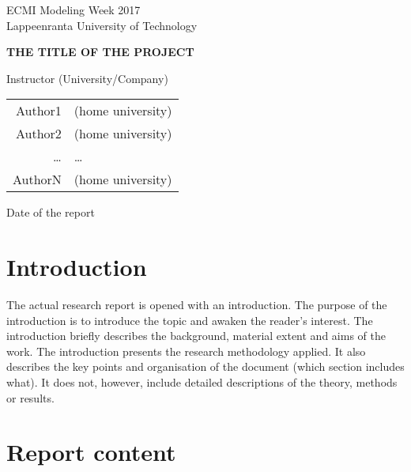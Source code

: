 \documentclass[12pt,oneside,a4paper]{article}
\begin{document}

\thispagestyle{empty} %

ECMI Modeling Week 2017\\
Lappeenranta University of Technology \\

\begin{center}
{\Large{\textbf{THE TITLE OF THE PROJECT}}}


Instructor (University/Company)

\begin{tabular}{rl}
Author1 & (home university) \\ 
Author2 & (home university) \\ 
\ldots & \ldots \\
AuthorN & (home university)
\end{tabular}


Date of the report
\end{center}



\newpage

\tableofcontents


\newpage
\section{Introduction}

The actual research report is opened with an introduction. The purpose of the introduction is to
introduce the topic and awaken the reader's interest. The introduction briefly describes the
background, material extent and aims of the work. The introduction presents the research methodology applied. 
It also describes the key points and organisation of the document (which section includes what). 
It does not, however, include detailed descriptions of the theory, methods or results. 

\section{Report content}
\end{document}
